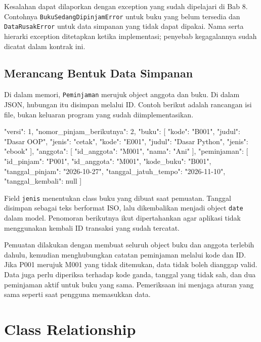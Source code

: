Kesalahan dapat dilaporkan dengan exception yang sudah dipelajari di Bab 8. Contohnya \texttt{BukuSedangDipinjamError} untuk buku yang belum tersedia dan \texttt{DataRusakError} untuk data simpanan yang tidak dapat dipakai. Nama serta hierarki exception ditetapkan ketika implementasi; penyebab kegagalannya sudah dicatat dalam kontrak ini.

\subsection{Merancang Bentuk Data Simpanan}

Di dalam memori, \texttt{Peminjaman} merujuk object anggota dan buku. Di dalam JSON, hubungan itu disimpan melalui ID. Contoh berikut adalah rancangan isi file, bukan keluaran program yang sudah diimplementasikan.

\begin{keluaran}
{
  "versi": 1,
  "nomor_pinjam_berikutnya": 2,
  "buku": [
    {"kode": "B001", "judul": "Dasar OOP", "jenis": "cetak"},
    {"kode": "E001", "judul": "Dasar Python", "jenis": "ebook"}
  ],
  "anggota": [
    {"id_anggota": "M001", "nama": "Ani"}
  ],
  "peminjaman": [
    {
      "id_pinjam": "P001",
      "id_anggota": "M001",
      "kode_buku": "B001",
      "tanggal_pinjam": "2026-10-27",
      "tanggal_jatuh_tempo": "2026-11-10",
      "tanggal_kembali": null
    }
  ]
}
\end{keluaran}

Field \texttt{jenis} menentukan class buku yang dibuat saat pemuatan. Tanggal disimpan sebagai teks berformat ISO, lalu dikembalikan menjadi object \texttt{date} dalam model. Penomoran berikutnya ikut dipertahankan agar aplikasi tidak menggunakan kembali ID transaksi yang sudah tercatat.

Pemuatan dilakukan dengan membuat seluruh object buku dan anggota terlebih dahulu, kemudian menghubungkan catatan peminjaman melalui kode dan ID. Jika P001 merujuk M001 yang tidak ditemukan, data tidak boleh dianggap valid. Data juga perlu diperiksa terhadap kode ganda, tanggal yang tidak sah, dan dua peminjaman aktif untuk buku yang sama. Pemeriksaan ini menjaga aturan yang sama seperti saat pengguna memasukkan data.

\section{Class Relationship}

